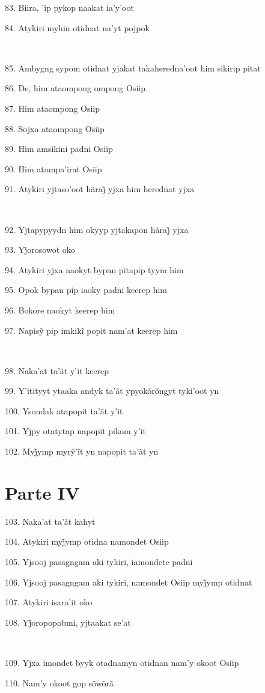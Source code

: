 83. Biira, 'ip pykop naakat ia'y'oot

84. Atykiri myhin otidnat na'yt pojpok

~

85. Ambygng sypom otidnat yjakat takaheredna'oot him sikirip pitat

86. De, him ataompong ompong Osiip

87. Him ataompong Osiip

88. Sojxa ataompong Osiip

89. Him amsikini padni Osiip

90. Him atampa'irat Osiip

91. Atykiri yjtaso’oot hãraj̃ yjxa him herednat yjxa

~

92. Yjtapypyydn him okyyp yjtakapon hãraj̃ yjxa

93. Yj̃orosowot oko

94. Atykiri yjxa naokyt bypan pitapip tyym him

95. Opok bypan pip iaoky padni keerep him

96. Bokore naokyt keerep him

97. Napisỹ pip imkikĩ popit nam’at keerep him

~

98. Naka'at ta'ãt y'it keerep

99. Y'itityyt ytaaka andyk ta'ãt ypyokõrõngyt tyki'oot yn

100. Ysondak atapopit ta'ãt y'it

101. Yjpy otatytap napopit pikom y'it

102. Myj̃ymp myrỹ’ĩt yn napopit ta’ãt yn

\section{Parte IV}

103. Naka'at ta'ãt kahyt

104. Atykiri myj̃ymp otidna namondet Osiip

105. Yjsooj pasagngam aki tykiri, iamondete padni

106. Yjsooj pasagngam aki tykiri, namondet Osiip myj̃ymp otidnat

107. Atykiri isara'it oko

108. Yj̃oropopobmi, yjtaakat se’at

~

109. Yjxa imondet byyk otadnamyn otidnan nam'y okoot Osiip

110. Nam'y okoot gop sõwõrã

